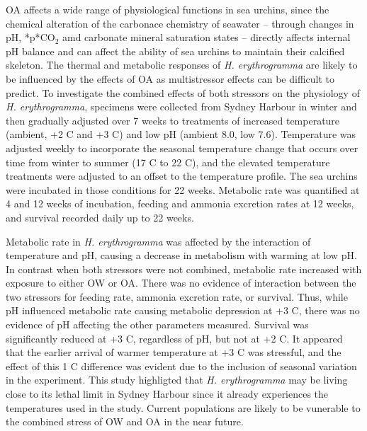 OA affects a wide range of physiological functions in sea urchins, since the chemical alteration of the carbonace chemistry of seawater -- through changes in pH, *p*$\mathrm{CO_2}$ amd carbonate mineral saturation states -- directly affects internal pH balance and can affect the ability of sea urchins to maintain their calcified skeleton.
The thermal and metabolic responses of \textit{H. erythrogramma} are likely to be influenced by the effects of OA as multistressor effects can be difficult to predict.
To investigate the combined effects of both stressors on the physiology of \textit{H. erythrogramma}, specimens were collected from Sydney Harbour in winter and then gradually adjusted over 7 weeks to treatments of increased temperature (ambient, +2 \degree C and +3 \degree C) and low pH (ambient 8.0, low 7.6).
Temperature was adjusted weekly to incorporate the seasonal temperature change that occurs over time from winter to summer (17 \degree C to 22 \degree C), and the elevated temperature treatments were adjusted to an offset to the temperature profile.
The sea urchins were incubated in those conditions for 22 weeks.
Metabolic rate was quantified at 4 and 12 weeks of incubation, feeding and ammonia excretion rates at 12 weeks, and survival recorded daily up to 22 weeks.

Metabolic rate in \textit{H. erythrogramma} was affected by the interaction of temperature and pH, causing a decrease in metabolism with warming at low pH.
In contrast when both stressors were not combined, metabolic rate increased with exposure to either OW or OA.
There was no evidence of interaction between the two stressors for feeding rate, ammonia excretion rate, or survival. 
Thus, while pH influenced metabolic rate causing metabolic depression at +3 \degree C, there was no evidence of pH affecting the other parameters measured. 
Survival was significantly reduced at +3 \degree C, regardless of pH, but not at +2 \degree C. 
It appeared that the earlier arrival of warmer temperature at +3 \degree C was stressful, and the effect of this 1 \degree C difference was evident due to the inclusion of seasonal variation in the experiment.
This study highligted that \textit{H. erythrogramma} may be living close to its lethal limit in Sydney Harbour since it already experiences the temperatures used in the study. Current populations are likely to be vunerable to the combined stress of OW and OA in the near future.

